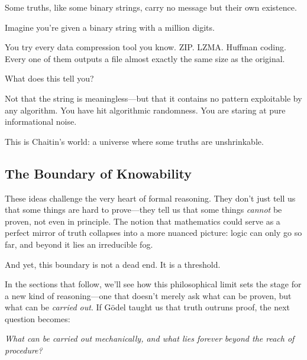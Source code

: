 Some truths, like some binary strings, carry no message but their own existence.

\begin{tcolorbox}[colback=gray!5!white, colframe=black!75!white, title={Compression Test: A Thought Experiment}]
Imagine you're given a binary string with a million digits.

You try every data compression tool you know. ZIP. LZMA. Huffman coding. Every one of them outputs a file almost exactly the same size as the original.

What does this tell you?

Not that the string is meaningless—but that it contains no pattern exploitable by any algorithm. You have hit algorithmic randomness. You are staring at pure informational noise.

This is Chaitin’s world: a universe where some truths are unshrinkable.
\end{tcolorbox}


\subsection{The Boundary of Knowability}

These ideas challenge the very heart of formal reasoning. They don’t just tell us that some things are hard to prove—they tell us that some things \emph{cannot} be proven, not even in principle. The notion that mathematics could serve as a perfect mirror of truth collapses into a more nuanced picture: logic can only go so far, and beyond it lies an irreducible fog.

And yet, this boundary is not a dead end. It is a threshold.

In the sections that follow, we’ll see how this philosophical limit sets the stage for a new kind of reasoning—one that doesn’t merely ask what can be proven, but what can be \emph{carried out}. If Gödel taught us that truth outruns proof, the next question becomes:

\begin{center}
    \emph{What can be carried out mechanically, and what lies forever beyond the reach of procedure?}
\end{center}
